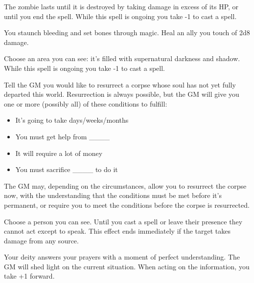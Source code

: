 The zombie lasts until it is destroyed by taking damage in excess of its HP, or until you end the spell. While this spell is ongoing you take -1 to cast a spell.



You staunch bleeding and set bones through magic. Heal an ally you touch of 2d8 damage.



Choose an area you can see: it's filled with supernatural darkness and shadow. While this spell is ongoing you take -1 to cast a spell.



Tell the GM you would like to resurrect a corpse whose soul has not yet fully departed this world. Resurrection is always possible, but the GM will give you one or more (possibly all) of these conditions to fulfill:
\begin{itemize}
\item It's going to take days/weeks/months
\item You must get help from \_\_\_\_
\item It will require a lot of money
\item You must sacrifice \_\_\_\_ to do it

\end{itemize}

The GM may, depending on the circumstances, allow you to resurrect the corpse now, with the understanding that the conditions must be met before it's permanent, or require you to meet the conditions before the corpse is resurrected.



Choose a person you can see. Until you cast a spell or leave their presence they cannot act except to speak. This effect ends immediately if the target takes damage from any source.



Your deity answers your prayers with a moment of perfect understanding. The GM will shed light on the current situation. When acting on the information, you take +1 forward.

